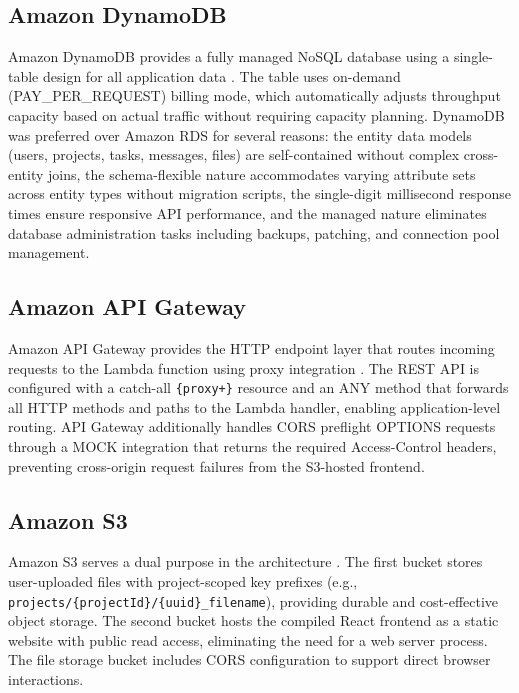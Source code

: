 \documentclass[conference]{IEEEtran}
\begin{document}
\subsection{Amazon DynamoDB}

Amazon DynamoDB provides a fully managed NoSQL database using a single-table design for all application data \cite{awsdynamodb}. The table uses on-demand (PAY\_PER\_REQUEST) billing mode, which automatically adjusts throughput capacity based on actual traffic without requiring capacity planning. DynamoDB was preferred over Amazon RDS for several reasons: the entity data models (users, projects, tasks, messages, files) are self-contained without complex cross-entity joins, the schema-flexible nature accommodates varying attribute sets across entity types without migration scripts, the single-digit millisecond response times ensure responsive API performance, and the managed nature eliminates database administration tasks including backups, patching, and connection pool management.

\subsection{Amazon API Gateway}

Amazon API Gateway provides the HTTP endpoint layer that routes incoming requests to the Lambda function using proxy integration \cite{awsapigateway}. The REST API is configured with a catch-all \texttt{\{proxy+\}} resource and an ANY method that forwards all HTTP methods and paths to the Lambda handler, enabling application-level routing. API Gateway additionally handles CORS preflight OPTIONS requests through a MOCK integration that returns the required Access-Control headers, preventing cross-origin request failures from the S3-hosted frontend.

\subsection{Amazon S3}

Amazon S3 serves a dual purpose in the architecture \cite{awss3}. The first bucket stores user-uploaded files with project-scoped key prefixes (e.g., \texttt{projects/\{projectId\}/\{uuid\}\_filename}), providing durable and cost-effective object storage. The second bucket hosts the compiled React frontend as a static website with public read access, eliminating the need for a web server process. The file storage bucket includes CORS configuration to support direct browser interactions.
\end{document}
